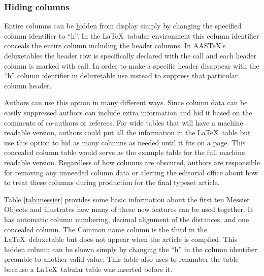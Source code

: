 \documentclass[preprint]{aastex62}
\newcommand\aastex{AAS\TeX}
\newcommand\latex{La\TeX}
\begin{document}
\subsubsection{Hiding columns} \label{subsubsec:hide}

Entire columns can be \underline{h}idden from display simply by changing
the specified column identifier to ``h''.  In the \latex\ tabular environment
this column identifier conceals the entire column including the header
columns.   In \aastex's deluxetables the header row is specifically
declared with the {\tt\string\tablehead} call and each header column is
marked with {\tt\string\colhead} call.  In order to make a specific header
disappear with the ``h'' column identifier in deluxetable use 
{\tt\string\nocolhead} instead to suppress that particular column header.

Authors can use this option in many different ways.  Since column data can
be easily suppressed authors can include extra information and hid it
based on the comments of co-authors or referees.  For wide tables that will
have a machine readable version, authors could put all the information in
the \latex\ table but use this option to hid as many columns as needed until
it fits on a page. This concealed column table would serve as the
example table for the full machine readable version.  Regardless of how
columns are obscured, authors are responsible for removing any unneeded
column data or alerting the editorial office about how to treat these
columns during production for the final typeset article.

Table \ref{tab:messier} provides some basic information about the first ten
Messier Objects and illustrates how many of these new features can be used
together.  It has automatic column numbering, decimal alignment of the
distances, and one concealed column.  The Common name column
is the third in the \latex\ deluxetable but does not appear when the article
is compiled. This hidden column can be shown simply by changing the ``h'' in
the column identifier preamble to another valid value.  This table also
uses {\tt\string\tablenum} to renumber the table because a \latex\ tabular
table was inserted before it.
\end{document}
